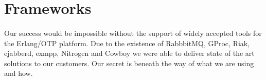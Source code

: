 \documentclass[11pt]{article}
\begin{document}

\section*{Frameworks}
\paragraph{}
Our success would be impossible without the support of widely accepted tools for the Erlang/OTP platform.
Due to the existence of RabbbitMQ, GProc, Riak, ejabberd, exmpp, Nitrogen and
Cowboy we were able to deliver state of the art solutions to our customers. 
Our secret is beneath the way of what we are using and how.


\end{document}
